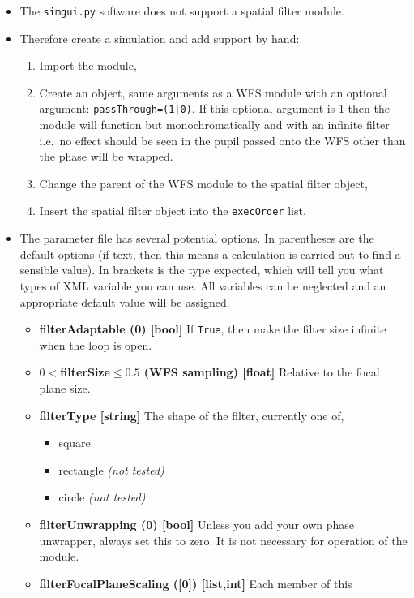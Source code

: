 \documentclass{article}
\begin{document}
\begin{itemize}
   \item The {\tt simgui.py} software does not support a spatial
   filter module.
   \item Therefore create a simulation and add support by hand:
   \begin{enumerate}
      \item Import the module,
      \item Create an object, same arguments as a WFS module with an optional
      argument: {\tt passThrough=(1|0)}. If this optional argument is 1 then
      the module will function but monochromatically and with an infinite
      filter i.e.~no effect should be seen in the pupil passed onto the
      WFS other than the phase will be wrapped.
      \item Change the parent of the WFS module to the spatial filter object,
      \item Insert the spatial filter object into the {\tt execOrder} list.
   \end{enumerate}
   \item The parameter file has several potential options. In parentheses
   are the default options (if text, then this means a calculation is carried
   out to find a sensible value). In brackets is the type expected, which
   will tell you what types of XML variable you can use. All variables
   can be neglected and an appropriate default value will be assigned.
   \begin{itemize}
      \item {\bf filterAdaptable (0) [bool]} If {\tt True}, then make the
      filter size infinite when the loop is open.
      \item {\bf $0<$filterSize$\le0.5$ (WFS sampling) [float]} Relative to the
      focal plane size.  \item {\bf filterType [string]} The shape of the
      filter, currently one of,
      \begin{itemize}
         \item square
         \item rectangle {\it (not tested)}
         \item circle {\it (not tested)}
      \end{itemize}
      \item {\bf filterUnwrapping (0) [bool]} Unless you add your own phase
      unwrapper, always set this to zero. It is not necessary for operation of
      the module.
      \item {\bf filterFocalPlaneScaling ([0]) [list,int]} Each member of this

\end{itemize}
\end{itemize}
\end{document}
